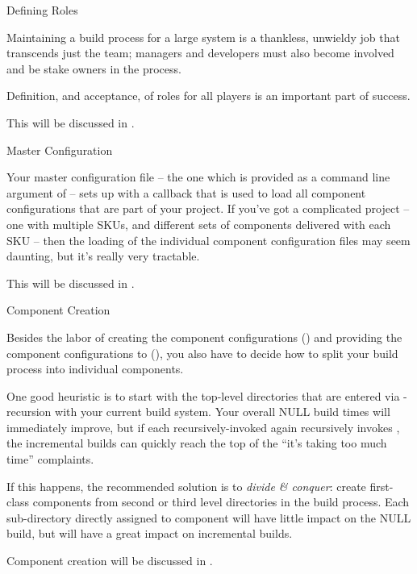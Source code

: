 \begin{description}
\item Defining Roles

  Maintaining a build process for a large system is a thankless,
  unwieldy job that transcends just the \bni team; managers and
  developers must also become involved and be stake owners in the
  process.

  Definition, and acceptance, of roles for all players is an important
  part of success.

  This will be discussed in .

\item Master Configuration

  Your master configuration file -- the one which is provided as a
  command line argument of \lmsbw -- sets up \lmsbw with a callback
  that is used to load all component configurations that are part of
  your project.  If you've got a complicated project -- one with
  multiple SKUs, and different sets of components delivered with each
  SKU -- then the loading of the individual component configuration
  files may seem daunting, but it's really very tractable.

  This will be discussed in .

\item Component Creation


  Besides the labor of creating the component configurations
  () and providing the component
  configurations to \lmsbw (), you
  also have to decide how to split your build process into individual
  components.

  One good heuristic is to start with the top-level directories that
  are entered via \make-recursion with your current build system.
  Your overall NULL build times will immediately improve, but if each
  recursively-invoked \makefile again recursively invokes \make, the
  incremental builds can quickly reach the top of the ``it's taking
  too much time'' complaints.

  If this happens, the recommended solution is to \emph{divide \&
    conquer}: create first-class components from second or third level
  directories in the build process.  Each sub-directory directly
  assigned to component will have little impact on the NULL build, but
  will have a great impact on incremental builds.

  Component creation will be discussed in
  .


\end{description}
